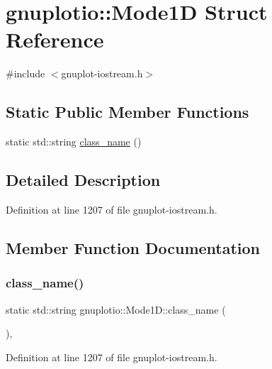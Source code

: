 \hypertarget{structgnuplotio_1_1_mode1_d}{}\section{gnuplotio\+:\+:Mode1D Struct Reference}
\label{structgnuplotio_1_1_mode1_d}


{\ttfamily \#include $<$gnuplot-\/iostream.\+h$>$}

\subsection*{Static Public Member Functions}
\begin{DoxyCompactItemize}
\item 
static std\+::string \hyperlink{structgnuplotio_1_1_mode1_d_a508d170d84da4dfb7cd07eebad894b8f}{class\+\_\+name} ()
\end{DoxyCompactItemize}


\subsection{Detailed Description}


Definition at line 1207 of file gnuplot-\/iostream.\+h.



\subsection{Member Function Documentation}
\mbox{\label{structgnuplotio_1_1_mode1_d_a508d170d84da4dfb7cd07eebad894b8f}} 
\subsubsection{\texorpdfstring{class\+\_\+name()}{class\_name()}}
{\footnotesize\ttfamily static std\+::string gnuplotio\+::\+Mode1\+D\+::class\+\_\+name (\begin{DoxyParamCaption}{ }\end{DoxyParamCaption})\hspace{0.3cm}{\ttfamily [inline]}, {\ttfamily [static]}}



Definition at line 1207 of file gnuplot-\/iostream.\+h.



